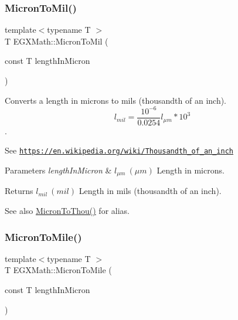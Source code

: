 \subsubsection{\texorpdfstring{Micron\+To\+Mil()}{MicronToMil()}}
{\footnotesize\ttfamily template$<$typename T $>$ \\
T E\+G\+X\+Math\+::\+Micron\+To\+Mil (\begin{DoxyParamCaption}\item[{const T}]{length\+In\+Micron }\end{DoxyParamCaption})}



Converts a length in microns to mils (thousandth of an inch). \[ l_{mil}= \frac{10^{-6}}{0.0254} l_{\mu m} * 10^{3} \]. 

See \href{https://en.wikipedia.org/wiki/Thousandth_of_an_inch}{\tt https\+://en.\+wikipedia.\+org/wiki/\+Thousandth\+\_\+of\+\_\+an\+\_\+inch} 
\begin{DoxyParams}{Parameters}
{\em length\+In\+Micron} & $ l_{\mu m}\ (\mu m)$ Length in microns. \\
\hline
\end{DoxyParams}
\begin{DoxyReturn}{Returns}
$ l_{mil}\ (mil)$ Length in mils (thousandth of an inch). 
\end{DoxyReturn}
\begin{DoxySeeAlso}{See also}
\mbox{\hyperlink{group___e_g_x_math-_conversions-_length_conversions-_non-_s_i-_micron-_imperial_gaf75a5aad3349d690e8b1bea619fc8706}{Micron\+To\+Thou()}} for alias. 
\end{DoxySeeAlso}
\mbox{\label{group___e_g_x_math-_conversions-_length_conversions-_non-_s_i-_micron-_imperial_ga4a6e2d3df67af4008be36f3899c1ca19}} 
\subsubsection{\texorpdfstring{Micron\+To\+Mile()}{MicronToMile()}}
{\footnotesize\ttfamily template$<$typename T $>$ \\
T E\+G\+X\+Math\+::\+Micron\+To\+Mile (\begin{DoxyParamCaption}\item[{const T}]{length\+In\+Micron }\end{DoxyParamCaption})}



